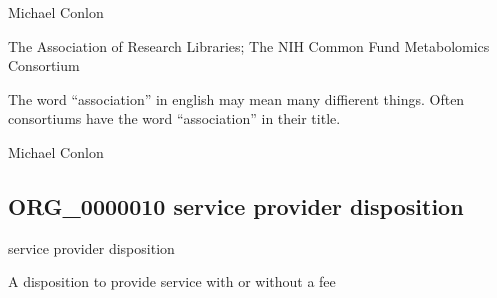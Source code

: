 \documentclass[letterpaper,10pt,english]{sphinxmanual}
\begin{document}
\begin{sphinxShadowBox}

\sphinxAtStartPar
Michael Conlon 
\end{sphinxShadowBox}

\begin{sphinxShadowBox}

\sphinxAtStartPar
The Association of Research Libraries; The NIH Common Fund Metabolomics Consortium
\end{sphinxShadowBox}

\begin{sphinxShadowBox}

\sphinxAtStartPar
The word “association” in english may mean many diffierent things.  Often consortiums have the word “association” in their title.
\end{sphinxShadowBox}

\begin{sphinxShadowBox}

\sphinxAtStartPar
Michael Conlon 
\end{sphinxShadowBox}
\begin{quote}

\ignorespaces \end{quote}


\subsection{ORG\_0000010 \sphinxhyphen{} service provider disposition}
\label{\detokenize{doc-ORG_0000010:org-0000010-service-provider-disposition}}\label{\detokenize{doc-ORG_0000010:index-0}}\label{\detokenize{doc-ORG_0000010::doc}}
\begin{sphinxShadowBox}

\sphinxAtStartPar
service provider disposition
\end{sphinxShadowBox}

\begin{sphinxShadowBox}

\sphinxAtStartPar
A disposition to provide service with or without a fee
\end{sphinxShadowBox}
\end{document}
